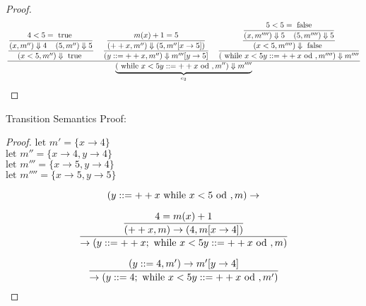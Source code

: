 \begin{enumerate}
\begin{proof}
\[
	\dfrac
	{
            	\dfrac
            	{
            		\dfrac
            		{
            			4 < 5 = \text{ true }
            		}
            		{
            			(x, m'') \Downarrow 4 \hspace*{4mm} (5, m'') \Downarrow 5
            		}
            	}
            	{	
        			(x < 5, m'') \Downarrow \text{ true }
            	}
            	\hspace*{4mm}
            	\dfrac
            	{
            		\dfrac
            		{
            			m(x) + 1 = 5
            		}
            		{
            			(++x, m'') \Downarrow (5, m''[x \rightarrow 5 ])
            		}
            	}
            	{	
        			(y ::= ++x, m'') \Downarrow m'''[y \rightarrow 5]
            	}
            	\hspace*{4mm}
            	\dfrac
            	{
            		\dfrac
            		{
            			\dfrac
            			{
            				5 < 5 = \text{ false}
            			}
            			{
            				(x, m'''') \Downarrow 5 \hspace*{4mm} (5, m'''') \Downarrow 5
            			}
            		}
            		{
            			(x < 5, m'''') \Downarrow \text{ false }
            		}
            	}
            	{	
            		(\while x < 5 \do y ::= ++x \od, m'''') \Downarrow m''''
            	}
	}
	{
		\underbrace{
			(\while x < 5 \do y ::= ++x \od, m'') \Downarrow m''''
		}_{e_2}
	}
\]

\end{proof}

\pagebreak
Transition Semantics Proof: \\

\begin{proof}

\( \text{let } m' = \{ x \rightarrow 4 \}	 \) \\
\( \text{let } m'' = \{ x \rightarrow 4, y \rightarrow 4 \}	 \) \\
\( \text{let } m''' = \{ x \rightarrow 5, y \rightarrow 4 \}	 \) \\
\( \text{let } m'''' = \{ x \rightarrow 5, y \rightarrow 5 \}	 \)

\[
	(\do y::= ++x \while x < 5 \od, m) \rightarrow
\]

\[
	\dfrac
	{
		\dfrac
		{
			4 = m(x) + 1
		}
		{
			(++x, m) \rightarrow (4, m[x \rightarrow 4])
		}
	}
	{
		\rightarrow (y ::= ++x ; \while x < 5 \do y ::= ++x \od, m)
	}
\]

\[
	\frac
	{
		(y ::= 4, m') \rightarrow m'[y \rightarrow 4]
	}
	{
		\rightarrow (y ::= 4; \while x < 5 \do y ::= ++x \od, m')
	}
\]


\end{proof}
\end{enumerate}

